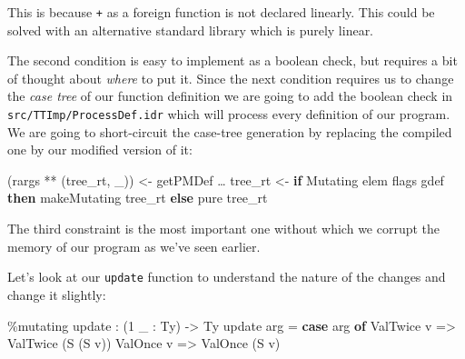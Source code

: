 \documentclass[
]{article}
\newenvironment{Shaded}{}{}
\newcommand{\DataTypeTok}[1]{\textcolor[rgb]{0.56,0.13,0.00}{#1}}
\newcommand{\DecValTok}[1]{\textcolor[rgb]{0.25,0.63,0.44}{#1}}
\newcommand{\FunctionTok}[1]{\textcolor[rgb]{0.02,0.16,0.49}{#1}}
\newcommand{\KeywordTok}[1]{\textcolor[rgb]{0.00,0.44,0.13}{\textbf{#1}}}
\newcommand{\NormalTok}[1]{#1}
\newcommand{\OperatorTok}[1]{\textcolor[rgb]{0.40,0.40,0.40}{#1}}
\newcommand{\OtherTok}[1]{\textcolor[rgb]{0.00,0.44,0.13}{#1}}
\begin{document}
This is because \texttt{+} as a foreign function is not declared
linearly. This could be solved with an alternative standard library
which is purely linear.

The second condition is easy to implement as a boolean check, but
requires a bit of thought about \emph{where} to put it. Since the next
condition requires us to change the \emph{case tree} of our function
definition we are going to add the boolean check in
\texttt{src/TTImp/ProcessDef.idr} which will process every definition of
our program. We are going to short-circuit the case-tree generation by
replacing the compiled one by our modified version of it:

\begin{Shaded}
\begin{Highlighting}[]
\NormalTok{(rargs }\OperatorTok{**}\NormalTok{ (tree\_rt\textquotesingle{}, \_)) }\OtherTok{\textless{}{-}}\NormalTok{ getPMDef …}
\NormalTok{tree\_rt }\OtherTok{\textless{}{-}} \KeywordTok{if} \DataTypeTok{Mutating} \OtherTok{\textasciigrave{}elem\textasciigrave{}}\NormalTok{ flags gdef}
              \KeywordTok{then}\NormalTok{ makeMutating tree\_rt\textquotesingle{}}
              \KeywordTok{else} \FunctionTok{pure}\NormalTok{ tree\_rt\textquotesingle{}}
\end{Highlighting}
\end{Shaded}

The third constraint is the most important one without which we corrupt
the memory of our program as we've seen earlier.

Let's look at our \texttt{update} function to understand the nature of
the changes and change it slightly:

\begin{Shaded}
\begin{Highlighting}[]
\OperatorTok{\%}\NormalTok{mutating}
\NormalTok{update }\OperatorTok{:}\NormalTok{ (}\DecValTok{1}\NormalTok{ \_ }\OperatorTok{:} \DataTypeTok{Ty}\NormalTok{) }\OtherTok{{-}\textgreater{}} \DataTypeTok{Ty}
\NormalTok{update arg }\OtherTok{=} \KeywordTok{case}\NormalTok{ arg }\KeywordTok{of}
                  \DataTypeTok{ValTwice}\NormalTok{ v }\OtherTok{=\textgreater{}} \DataTypeTok{ValTwice}\NormalTok{ (}\DataTypeTok{S}\NormalTok{ (}\DataTypeTok{S}\NormalTok{ v))}
                  \DataTypeTok{ValOnce}\NormalTok{ v }\OtherTok{=\textgreater{}} \DataTypeTok{ValOnce}\NormalTok{ (}\DataTypeTok{S}\NormalTok{ v)}
\end{Highlighting}
\end{Shaded}
\end{document}
